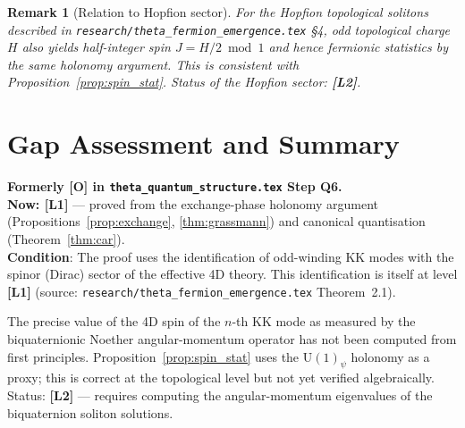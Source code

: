 \documentclass[11pt,a4paper]{article}
\newtheorem{remark}{Remark}
\newcommand{\Lone}{\textbf{[L1]}}
\newcommand{\Ltwo}{\textbf{[L2]}}
\begin{document}
\begin{remark}[Relation to Hopfion sector]
  For the Hopfion topological solitons described in
  \texttt{research/theta\_fermion\_emergence.tex} §4, odd topological
  charge $H$ also yields half-integer spin $J = H/2 \bmod 1$ and hence
  fermionic statistics by the same holonomy argument.  This is consistent
  with Proposition~\ref{prop:spin_stat}.
  Status of the Hopfion sector: \Ltwo{}.
\end{remark}

\section{Gap Assessment and Summary}
\label{sec:gaps}

\begin{tcolorbox}[colback=green!5!white,colframe=green!50!black,
  title=Closed Gap: Grassmannian Measure for Odd-Winding Modes]
  \textbf{Formerly [O] in \texttt{theta\_quantum\_structure.tex} Step Q6.}\\[4pt]
  \textbf{Now: \Lone{}} — proved from the exchange-phase holonomy argument
  (Propositions~\ref{prop:exchange}, \ref{thm:grassmann}) and canonical
  quantisation (Theorem~\ref{thm:car}).\\[4pt]
  \textbf{Condition}: The proof uses the identification of odd-winding KK modes
  with the spinor (Dirac) sector of the effective 4D theory.
  This identification is itself at level \Lone{} (source:
  \texttt{research/theta\_fermion\_emergence.tex} Theorem~2.1).
\end{tcolorbox}

\medskip

\begin{tcolorbox}[colback=orange!10!white,colframe=orange!75!black,
  title=Remaining Gap: Spin from Noether Theorem]
  The precise value of the 4D spin of the $n$-th KK mode as measured by the
  biquaternionic Noether angular-momentum operator has not been computed from
  first principles.
  Proposition~\ref{prop:spin_stat} uses the $\mathrm{U}(1)_\psi$ holonomy as
  a proxy; this is correct at the topological level but not yet verified
  algebraically.
  Status: \Ltwo{} — requires computing the angular-momentum eigenvalues of the
  biquaternion soliton solutions.
\end{tcolorbox}

\medskip
\end{document}
